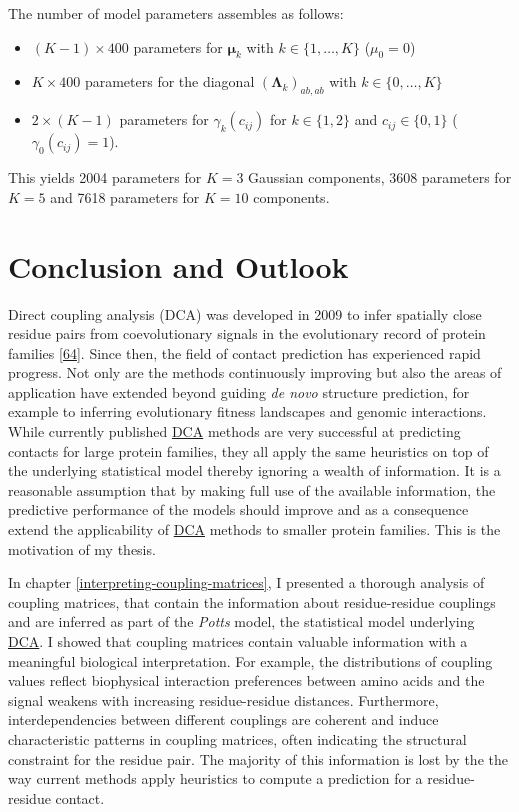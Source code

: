 \documentclass[11pt,a4paper,twoside]{book}
\providecommand{\tightlist}{%
  \setlength{\itemsep}{0pt}\setlength{\parskip}{0pt}}
\newcommand{\eq}{\!=\!}
\newcommand{\Lk}{\mathbf{\Lambda}_k}
\newcommand{\muk}{\mathbf{\mu}_k}
\newcommand{\cij}{c_{ij}}
\theoremstyle{definition}
\theoremstyle{definition}
\theoremstyle{remark}
\begin{document}
The number of model parameters assembles as follows:

\begin{itemize}
\tightlist
\item
  \((K-1) \times 400\) parameters for \(\muk\) with
  \(k \in \{1, \ldots, K \}\) (\(\mu_0 = 0\))
\item
  \(K \times 400\) parameters for the diagonal \((\Lk)_{ab, ab}\) with
  \(k \in \{0, \ldots, K\}\)
\item
  \(2 \times (K\!-\!1)\) parameters for \(\gamma_k(\cij)\) for
  \(k \in \{1,2\}\) and \(\cij \in \{0,1\}\) (\(\gamma_0(\cij)\eq1\)).
\end{itemize}

This yields 2004 parameters for \(K\eq3\) Gaussian components, 3608
parameters for \(K\eq5\) and 7618 parameters for \(K\eq10\) components.

\chapter{Conclusion and Outlook}\label{conclusion-and-outlook}

Direct coupling analysis (DCA) was developed in 2009 to infer spatially
close residue pairs from coevolutionary signals in the evolutionary
record of protein families {[}\protect\hyperlink{ref-Weigt2009}{64}{]}.
Since then, the field of contact prediction has experienced rapid
progress. Not only are the methods continuously improving but also the
areas of application have extended beyond guiding \emph{de novo}
structure prediction, for example to inferring evolutionary fitness
landscapes and genomic interactions. While currently published
\protect\hyperlink{abbrev}{DCA} methods are very successful at
predicting contacts for large protein families, they all apply the same
heuristics on top of the underlying statistical model thereby ignoring a
wealth of information. It is a reasonable assumption that by making full
use of the available information, the predictive performance of the
models should improve and as a consequence extend the applicability of
\protect\hyperlink{abbrev}{DCA} methods to smaller protein families.
This is the motivation of my thesis.

In chapter \ref{interpreting-coupling-matrices}, I presented a thorough
analysis of coupling matrices, that contain the information about
residue-residue couplings and are inferred as part of the \emph{Potts}
model, the statistical model underlying \protect\hyperlink{abbrev}{DCA}.
I showed that coupling matrices contain valuable information with a
meaningful biological interpretation. For example, the distributions of
coupling values reflect biophysical interaction preferences between
amino acids and the signal weakens with increasing residue-residue
distances. Furthermore, interdependencies between different couplings
are coherent and induce characteristic patterns in coupling matrices,
often indicating the structural constraint for the residue pair. The
majority of this information is lost by the the way current methods
apply heuristics to compute a prediction for a residue-residue contact.
\end{document}
